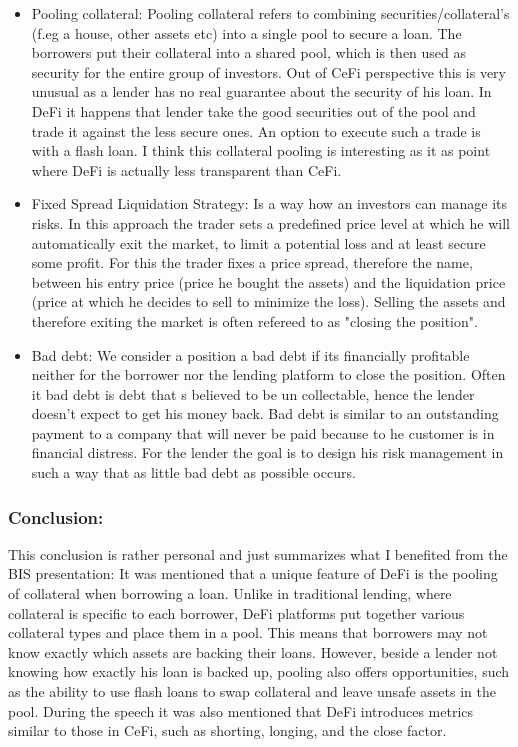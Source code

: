 \documentclass{article}
\begin{document}
\begin{itemize}
\item {Pooling collateral}: 
Pooling collateral refers to  combining securities/collateral's (f.eg a house, other assets etc) into a single pool to secure a loan. The borrowers put their collateral into a shared pool, which is then used as security for the entire group of investors. Out of CeFi perspective this is very unusual as a lender has no real guarantee about the security of his loan. In DeFi it happens that lender take the good securities out of the pool and trade it against the less secure ones. An option to execute such a trade is with a flash loan. I think this collateral pooling is interesting as it as point where DeFi is actually less transparent than CeFi. %

\item {Fixed Spread Liquidation Strategy}:
Is a way how an investors can manage its risks. In this approach the trader sets a predefined price level at which he will automatically exit the market, to limit a potential loss and at least secure some profit. For this the trader fixes a price spread, therefore the name, between his entry price (price he bought the assets) and the liquidation price (price at which he decides to sell to minimize the loss). Selling the assets and therefore exiting the market is often refereed to as "closing the position".

\item {Bad debt}: We consider a position a bad debt if its financially profitable neither for the borrower nor the lending platform to close the position. Often it bad debt is debt that s believed to be un collectable, hence the lender doesn't expect to get his money back. Bad debt is similar to an outstanding payment to a company that will never be paid because to
he customer is in financial distress. For the lender the goal is to design his risk management in such a way that as little bad debt as possible occurs.
\end{itemize}
\subsubsection{Conclusion:} %
This conclusion is rather personal and just summarizes what I benefited from the BIS presentation: It was mentioned that a unique feature of DeFi is the pooling of collateral when borrowing a loan. Unlike in traditional lending, where collateral is specific to each borrower, DeFi platforms put together various collateral types and place them in a pool. This means that borrowers may not know exactly which assets are backing their loans. However, beside a lender not knowing how exactly his loan is backed up, pooling also offers opportunities, such as the ability to use flash loans to swap collateral and leave unsafe assets in the pool. During the speech it was also mentioned that DeFi introduces metrics similar to those in CeFi, such as shorting, longing, and the close factor.
\end{document}
